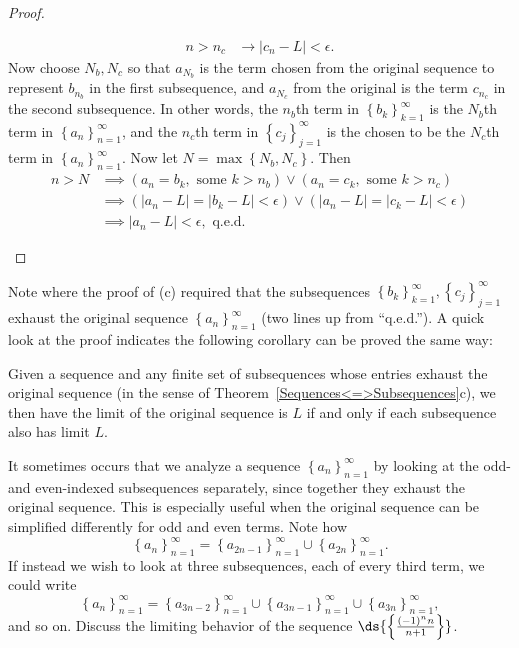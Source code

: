 \begin{proof}
\begin{enumerate}[\bf(a)]
\begin{align*}
n>n_c&\longrightarrow\left|c_n-L\right|<\epsilon.\end{align*}
Now choose $N_b,N_c$ so that $a_{N_b}$ is the term chosen from
the original sequence to represent $b_{n_b}$ in the first subsequence,
and $a_{N_c}$ from the original is the term $c_{n_c}$ in the
second subsequence.  In other words, the $n_b$th term in 
$\left\{b_k\right\}_{k=1}^\infty$ is the $N_b$th term in 
$\left\{a_n\right\}_{n=1}^\infty$, and the $n_c$th term in
$\left\{c_j\right\}_{j=1}^\infty$ is the chosen to be 
the $N_c$th term in $\left\{a_n\right\}_{n=1}^\infty$.
Now let $N=\max\left\{N_b,N_c\right\}$.  Then
\begin{align*}
n>N&\implies\left(a_n=b_k, \text{ some }k>n_b\right)
       \vee\left(a_n=c_k, \text{ some }k>n_c\right)\\
   &\implies\left(\left|a_n-L\right|=\left|b_k-L\right|<\epsilon\right)
       \vee\left(\left|a_n-L\right|=\left|c_k-L\right|<\epsilon\right)\\
   &\implies\left|a_n-L\right|<\epsilon,\text{ q.e.d.}\end{align*}
\end{enumerate}
\end{proof}
Note where the proof of (c) required that the subsequences
$\left\{b_k\right\}_{k=1}^\infty,\left\{c_j\right\}_{j=1}^\infty$
exhaust the original sequence $\left\{a_n\right\}_{n=1}^\infty$
(two lines up from ``q.e.d.'').
A quick look at the proof indicates the following corollary
can be proved the same way:
\begin{corollary} Given a sequence and any finite set of 
subsequences whose entries exhaust the original sequence
(in the sense of Theorem~\ref{Sequences<=>Subsequences}c),
we then have the limit of the original sequence is $L$ if and only if 
each subsequence also has limit $L$.
\end{corollary}
It sometimes occurs that we analyze a sequence 
$\left\{a_n\right\}_{n=1}^\infty$ by looking at 
the odd- and even-indexed
subsequences separately, 
since together they exhaust the original sequence.  This
is especially useful when the original sequence can
be simplified differently for odd and even terms.
Note how
$$\left\{a_n\right\}_{n=1}^\infty
=\left\{a_{2n-1}\right\}_{n=1}^\infty\cup
\left\{a_{2n}\right\}_{n=1}^\infty.$$
If instead we wish to look at three subsequences, each of every third term,
we could write
$$\left\{a_{n}\right\}_{n=1}^\infty
=\left\{a_{3n-2}\right\}_{n=1}^\infty\cup
\left\{a_{3n-1}\right\}_{n=1}^\infty\cup
\left\{a_{3n}\right\}_{n=1}^\infty,$$
and so on.
\bex Discuss the limiting behavior of the sequence
$\ds{\left\{\frac{(-1)^nn}{n+1}\right\}}$.

